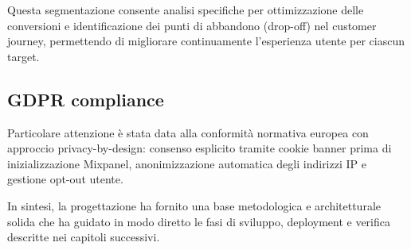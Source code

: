 Questa segmentazione consente analisi specifiche per ottimizzazione delle 
conversioni e identificazione dei punti di abbandono (drop-off) nel customer 
journey, permettendo di migliorare continuamente l'esperienza utente per 
ciascun target.

\subsection{GDPR compliance}
Particolare attenzione è stata data alla conformità normativa europea con 
approccio privacy-by-design: consenso esplicito tramite cookie banner prima 
di inizializzazione Mixpanel, anonimizzazione automatica degli indirizzi IP 
e gestione opt-out utente.

\bigskip
In sintesi, la progettazione ha fornito una base metodologica e architetturale 
solida che ha guidato in modo diretto le fasi di sviluppo, deployment e verifica 
descritte nei capitoli successivi.